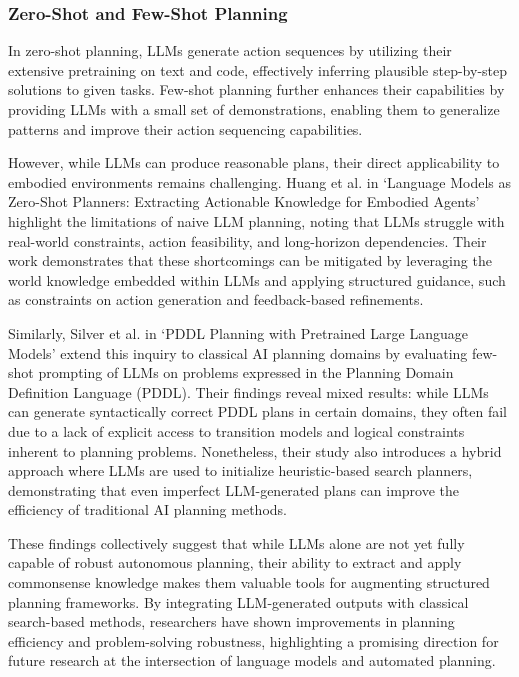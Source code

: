 \subsubsection{Zero-Shot and Few-Shot Planning}
In zero-shot planning, LLMs generate action sequences by utilizing their
extensive pretraining on text and code, effectively inferring plausible step-by-step
solutions to given tasks. Few-shot planning further enhances their capabilities
by providing LLMs with a small set of demonstrations, enabling them to generalize
patterns and improve their action sequencing capabilities.

However, while LLMs can produce reasonable plans, their direct applicability to embodied
environments remains challenging. Huang et al. \cite{huang2022languagemodelszeroshotplanners}
in `Language Models as Zero-Shot Planners: Extracting Actionable Knowledge for Embodied
Agents' highlight the limitations of naive LLM planning, noting that LLMs struggle
with real-world constraints, action feasibility, and long-horizon dependencies.
Their work demonstrates that these shortcomings can be mitigated by leveraging
the world knowledge embedded within LLMs and applying structured guidance, such as
constraints on action generation and feedback-based refinements.

Similarly, Silver et al. \cite{silver2022pddl} in `PDDL Planning with Pretrained
Large Language Models' extend this inquiry to classical AI planning domains by evaluating
few-shot prompting of LLMs on problems expressed in the Planning Domain Definition
Language (PDDL). Their findings reveal mixed results: while LLMs can generate syntactically
correct PDDL plans in certain domains, they often fail due to a lack of explicit
access to transition models and logical constraints inherent to planning
problems. Nonetheless, their study also introduces a hybrid approach where LLMs
are used to initialize heuristic-based search planners, demonstrating that even imperfect
LLM-generated plans can improve the efficiency of traditional AI planning methods.

These findings collectively suggest that while LLMs alone are not yet fully capable
of robust autonomous planning, their ability to extract and apply commonsense
knowledge makes them valuable tools for augmenting structured planning
frameworks. By integrating LLM-generated outputs with classical search-based methods,
researchers have shown improvements in planning efficiency and problem-solving
robustness, highlighting a promising direction for future research at the intersection
of language models and automated planning.

